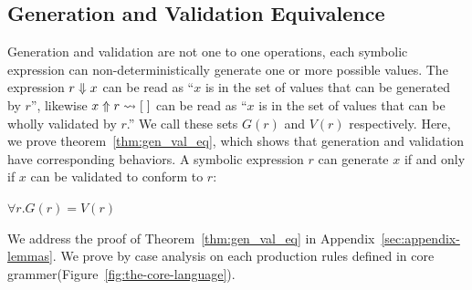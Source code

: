 \subsection{Generation and Validation Equivalence}
\par Generation and validation are not one to one operations, each symbolic
    expression can non-deterministically generate one or more possible values. The expression $r \Downarrow x$ can be read as ``$x$ is in the
    set of values that can be generated by $r$'', likewise $x \Uparrow r \leadsto [\;]$ can be read as ``$x$ is in the set of values
    that can be wholly validated by $r$.'' We call these sets $G(r)$ and $V(r)$ respectively. 
    Here, we prove theorem~\ref{thm:gen_val_eq}, which shows that generation and validation have corresponding behaviors.
    A symbolic expression $r$ can generate $x$ if and only if $x$ can be validated to conform to $r$:

\begin{theorem}
    \label{thm:gen_val_eq}
    $\forall r. G(r) = V(r)$
\end{theorem}

We address the proof of Theorem~\ref{thm:gen_val_eq} in Appendix~\ref{sec:appendix-lemmas}.
We prove by case analysis on each production rules defined 
in core grammer(Figure~\ref{fig:the-core-language}).